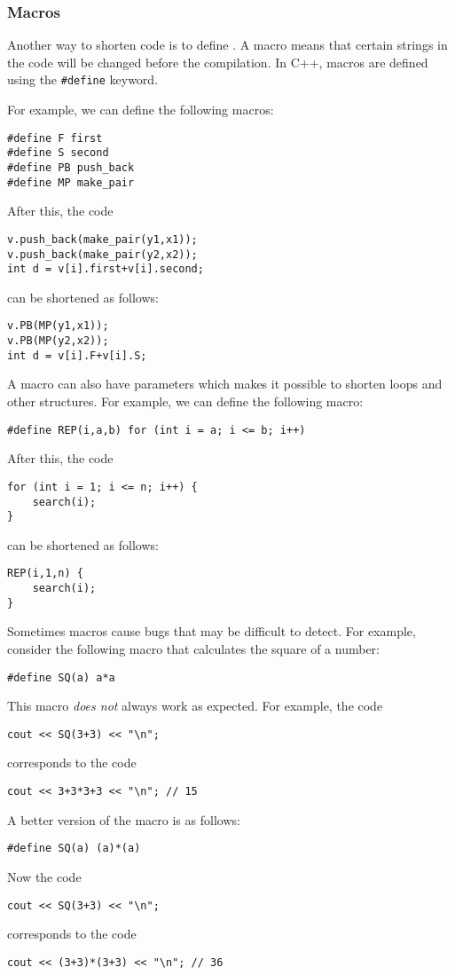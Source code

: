\subsubsection{Macros}
Another way to shorten code is to define
.
A macro means that certain strings in
the code will be changed before the compilation.
In C++, macros are defined using the
\texttt{\#define} keyword.

For example, we can define the following macros:
\begin{lstlisting}
#define F first
#define S second
#define PB push_back
#define MP make_pair
\end{lstlisting}
After this, the code
\begin{lstlisting}
v.push_back(make_pair(y1,x1));
v.push_back(make_pair(y2,x2));
int d = v[i].first+v[i].second;
\end{lstlisting}
can be shortened as follows:
\begin{lstlisting}
v.PB(MP(y1,x1));
v.PB(MP(y2,x2));
int d = v[i].F+v[i].S;
\end{lstlisting}

A macro can also have parameters
which makes it possible to shorten loops and other
structures.
For example, we can define the following macro:
\begin{lstlisting}
#define REP(i,a,b) for (int i = a; i <= b; i++)
\end{lstlisting}
After this, the code
\begin{lstlisting}
for (int i = 1; i <= n; i++) {
    search(i);
}
\end{lstlisting}
can be shortened as follows:
\begin{lstlisting}
REP(i,1,n) {
    search(i);
}
\end{lstlisting}

Sometimes macros cause bugs that may be difficult
to detect. For example, consider the following macro
that calculates the square of a number:
\begin{lstlisting}
#define SQ(a) a*a
\end{lstlisting}
This macro \emph{does not} always work as expected.
For example, the code
\begin{lstlisting}
cout << SQ(3+3) << "\n";
\end{lstlisting}
corresponds to the code
\begin{lstlisting}
cout << 3+3*3+3 << "\n"; // 15
\end{lstlisting}

A better version of the macro is as follows:
\begin{lstlisting}
#define SQ(a) (a)*(a)
\end{lstlisting}
Now the code
\begin{lstlisting}
cout << SQ(3+3) << "\n";
\end{lstlisting}
corresponds to the code
\begin{lstlisting}
cout << (3+3)*(3+3) << "\n"; // 36
\end{lstlisting}



